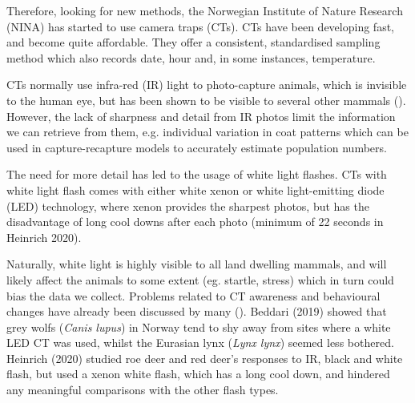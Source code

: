Therefore, looking for new methods, the Norwegian Institute of Nature Research (NINA) has started to use camera traps (CTs). CTs have been developing fast, and become quite affordable. They offer a consistent, standardised sampling method which also records date, hour and, in some instances, temperature.

CTs normally use infra-red (IR) light to photo-capture animals, which is invisible to the human eye, but has been shown to be visible to several other mammals (\cite{Meek2014}).
However, the lack of sharpness and detail from IR photos limit the information we can retrieve from them, e.g. individual variation in coat patterns which can be used in capture-recapture models to accurately estimate population numbers. 

The need for more detail has led to the usage of white light flashes.
CTs with white light flash comes with either white xenon or white light-emitting diode (LED) technology, where xenon provides the sharpest photos, but has the disadvantage of long cool downs after each photo (minimum of 22 seconds %
in Heinrich 2020).

Naturally, white light is highly visible to all land dwelling mammals, and will likely affect the animals to some extent (eg. startle, stress) which in turn could bias the data we collect. Problems related to CT awareness and behavioural changes have already been discussed by many ().
Beddari (2019) showed that grey wolfs (\textit{Canis lupus}) in Norway tend to shy away from sites where a white LED CT was used, whilst the Eurasian lynx (\textit{Lynx lynx}) seemed less bothered. Heinrich (2020) studied roe deer and red deer's responses to IR, black and white flash, but used a xenon white flash, which has a long cool down, and hindered any meaningful comparisons with the other flash types.




%



